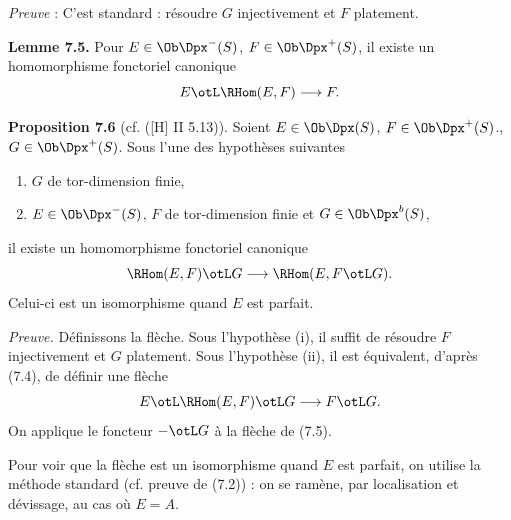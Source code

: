 \emph{Preuve} : C'est standard : résoudre \(G\) injectivement et \(F\) platement.

\textbf{Lemme 7.5.} Pour \(E\in\Ob\Dpx^-(S)\), \(F\in\Ob\Dpx^+(S)\), il existe un homomorphisme fonctoriel canonique
\[
  E\otL\RHom(E,F)\longrightarrow F.
\]

\textbf{Proposition 7.6} (cf. ([H] II 5.13)). Soient \(E\in\Ob\Dpx(S)\), \(F\in\Ob\Dpx^+(S)\)., \(G\in\Ob\Dpx^+(S)\). Sous l'une des hypothèses suivantes
\begin{enumerate}[label=\roman*)]
\item \(G\) de tor-dimension finie,
\item \(E\in\Ob\Dpx^-(S)\), \(F\) de tor-dimension finie et \(G\in\Ob\Dpx^b(S)\),
\end{enumerate}
il existe un homomorphisme fonctoriel canonique
\[
  \RHom(E,F)\otL G
  \longrightarrow
  \RHom(E,F\otL G).
\]
Celui-ci est un isomorphisme quand \(E\) est parfait.

\emph{Preuve.} Définissons la flèche. Sous l'hypothèse (i), il suffit de résoudre \(F\) injectivement et \(G\) platement. Sous l'hypothèse (ii), il est équivalent, d'après (7.4), de définir une flèche
\[
  E\otL\RHom(E,F)\otL G\longrightarrow F\otL G.
\]
On applique le foncteur \(-\otL G\) à la flèche de (7.5).

Pour voir que la flèche est un isomorphisme quand \(E\) est parfait, on utilise la méthode standard (cf. preuve de (7.2)) : on se ramène, par localisation et dévissage, au cas où \(E=A\).

